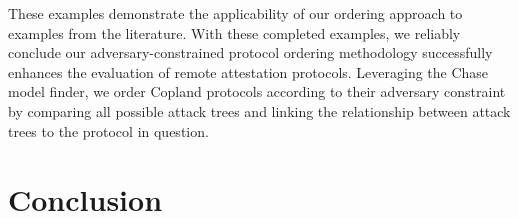 \documentclass[runningheads]{llncs}
\theoremstyle{definition}
\begin{document}
These examples demonstrate the applicability of our ordering approach to examples from the literature. With these completed examples, we reliably conclude our adversary-constrained protocol ordering methodology successfully enhances the evaluation of remote attestation protocols. Leveraging the Chase model finder, we order Copland protocols according to their adversary constraint by comparing all possible attack trees and linking the relationship between attack trees to the protocol in question.

\section{Conclusion}








%
% 
%
%
%

%

%
\end{document}
